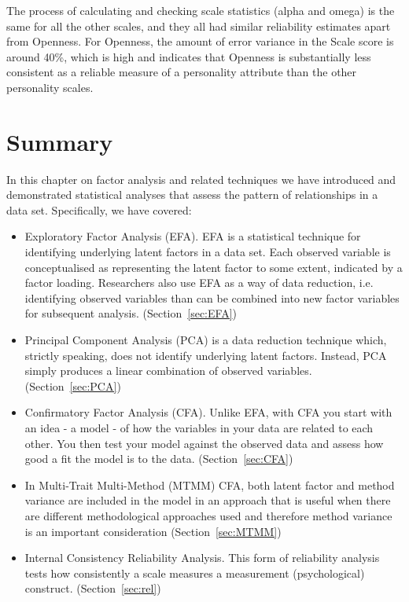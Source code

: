 The process of calculating and checking scale statistics (alpha and omega) is the same for all the other scales, and they all had similar reliability estimates apart from Openness. For Openness, the amount of error variance in the Scale score is around 40\%, which is high and indicates that Openness is substantially less consistent as a reliable measure of a personality attribute than the other personality scales. 


\section{Summary}

In this chapter on factor analysis and related techniques we have introduced and demonstrated statistical analyses that assess the pattern of relationships in a data set. Specifically, we have covered: 

\begin{itemize} \itemsep -2pt
\item Exploratory Factor Analysis (EFA). EFA is a statistical technique for identifying underlying latent factors in a data set. Each observed variable is conceptualised as representing the latent factor to some extent, indicated by a factor loading. Researchers also use EFA as a way of data reduction, i.e. identifying observed variables than can be combined into new factor variables for subsequent analysis. (Section~\ref{sec:EFA})
\item Principal Component Analysis (PCA) is a data reduction technique which, strictly speaking, does not identify underlying latent factors. Instead, PCA simply produces a linear combination of observed variables. (Section~\ref{sec:PCA})
\item Confirmatory Factor Analysis (CFA). Unlike EFA, with CFA you start with an idea - a model - of how the variables in your data are related to each other. You then test your model against the observed data and assess how good a fit the model is to the data.  (Section~\ref{sec:CFA})
\item In Multi-Trait Multi-Method (MTMM) CFA, both latent factor and method variance are included in the model in an approach that is useful when there are different methodological approaches used and therefore method variance is an important consideration (Section~\ref{sec:MTMM})
\item Internal Consistency Reliability Analysis. This form of reliability analysis tests how consistently a scale measures a measurement (psychological) construct. (Section~\ref{sec:rel})
\end{itemize}
